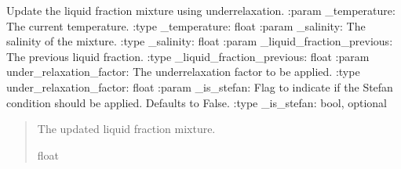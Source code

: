 \documentclass[a4paper,11pt,english,openany]{sphinxmanual}
\begin{document}
\begin{fulllineitems}
\label{\detokenize{api/spyice.update_physical_values:src.spyice.update_physical_values.update_liquid_fraction_mixture_with_enthalpy_equation}}
\pysigstartsignatures
\pysiglinewithargsret
{}
{\sphinxparamcomma {}\sphinxparamcomma {}\sphinxparamcomma {}\sphinxparamcomma {}}
{}
\pysigstopsignatures
\sphinxAtStartPar
Update the liquid fraction mixture using under\sphinxhyphen{}relaxation.
:param \_temperature: The current temperature.
:type \_temperature: float
:param \_salinity: The salinity of the mixture.
:type \_salinity: float
:param \_liquid\_fraction\_previous: The previous liquid fraction.
:type \_liquid\_fraction\_previous: float
:param under\_relaxation\_factor: The under\sphinxhyphen{}relaxation factor to be applied.
:type under\_relaxation\_factor: float
:param \_is\_stefan: Flag to indicate if the Stefan condition should be applied. Defaults to False.
:type \_is\_stefan: bool, optional
\begin{quote}\begin{description}
\sphinxAtStartPar
The updated liquid fraction mixture.

\sphinxAtStartPar
float

\end{description}\end{quote}

\end{fulllineitems}

\end{document}
